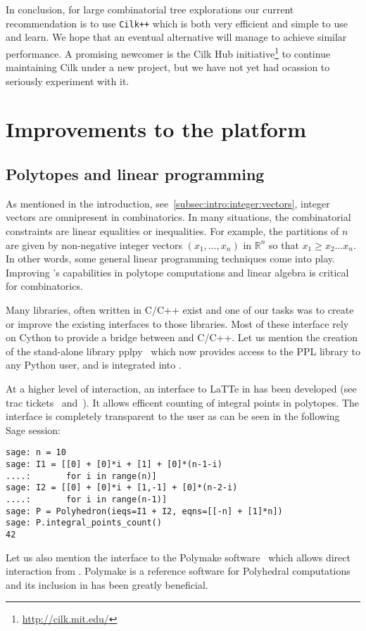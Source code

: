 \documentclass{deliverablereport}
\newcommand{\CilkP}{\texttt{Cilk++}\xspace}
\begin{document}
In conclusion, for large combinatorial tree explorations our current
recommendation is to use \CilkP which is both very efficient and simple to use
and learn. We hope that an eventual alternative will manage to achieve similar
performance. A promising newcomer is the Cilk Hub initiative\footnote{\url{http://cilk.mit.edu/}}
to continue maintaining Cilk under a new project, but we have not yet had ocassion to seriously
experiment with it.




\section{Improvements to the \Sage platform}


\subsection{Polytopes and linear programming}
\label{subsec:polytopes}

As mentioned in the introduction, see~\ref{subsec:intro:integer:vectors},
integer vectors are omnipresent in combinatorics. In many situations,
the combinatorial constraints are linear equalities or inequalities.
For example, the partitions of $n$ are given by non-negative integer
vectors $(x_1, \ldots, x_n)$ in $\mathbb{R}^n$ so that $x_1 \geq x_2 \ldots x_n$.
In other words, some general linear programming techniques come into
play. Improving \Sage's capabilities in polytope computations and linear algebra
is critical for combinatorics.

Many libraries, often written in C/C++ exist and one of our tasks was to
create or improve the existing \Sage interfaces to those libraries. Most of these interface
rely on Cython to provide a bridge between \Python and C/C++. Let
us mention the creation of the stand-alone library pplpy~\cite{pplpy-code} which now provides
access to the PPL library to any Python user, and is integrated into \Sage.

At a higher level of interaction, an interface to LaTTe in \Sage has
been developed (see trac tickets~\cite{trac-18211}
and~\cite{trac-22497}). It allows efficent counting of
integral points in polytopes. The interface is completely transparent to the
user as can be seen in the following Sage session:
\begin{verbatim}
sage: n = 10
sage: I1 = [[0] + [0]*i + [1] + [0]*(n-1-i)
....:       for i in range(n)]
sage: I2 = [[0] + [0]*i + [1,-1] + [0]*(n-2-i)
....:       for i in range(n-1)]
sage: P = Polyhedron(ieqs=I1 + I2, eqns=[[-n] + [1]*n])
sage: P.integral_points_count()
42
\end{verbatim}
Let us also mention the \Sage interface to the Polymake
software~\cite{polymake-code} which allows direct interaction from
\Sage. Polymake is a reference software for Polyhedral computations
and its inclusion in \Sage has been greatly beneficial.
\end{document}
